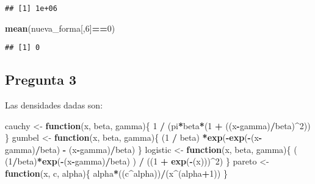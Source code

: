 \documentclass[]{article}
\newenvironment{Shaded}{\begin{snugshade}}{\end{snugshade}}
\newcommand{\ControlFlowTok}[1]{\textcolor[rgb]{0.13,0.29,0.53}{\textbf{#1}}}
\newcommand{\DecValTok}[1]{\textcolor[rgb]{0.00,0.00,0.81}{#1}}
\newcommand{\KeywordTok}[1]{\textcolor[rgb]{0.13,0.29,0.53}{\textbf{#1}}}
\newcommand{\NormalTok}[1]{#1}
\newcommand{\OperatorTok}[1]{\textcolor[rgb]{0.81,0.36,0.00}{\textbf{#1}}}
\newcommand{\StringTok}[1]{\textcolor[rgb]{0.31,0.60,0.02}{#1}}
\begin{document}
\begin{verbatim}
## [1] 1e+06
\end{verbatim}

\begin{Shaded}
\begin{Highlighting}[]
\KeywordTok{mean}\NormalTok{(nueva_forma[,}\DecValTok{6}\NormalTok{]}\OperatorTok{==}\DecValTok{0}\NormalTok{)}
\end{Highlighting}
\end{Shaded}

\begin{verbatim}
## [1] 0
\end{verbatim}

\hypertarget{pregunta-3}{%
\subsection{Pregunta 3}\label{pregunta-3}}

Las densidades dadas son:

\begin{Shaded}
\begin{Highlighting}[]
\NormalTok{cauchy <-}\StringTok{ }\ControlFlowTok{function}\NormalTok{(x, beta, gamma)\{ }
  \DecValTok{1} \OperatorTok{/}\StringTok{ }\NormalTok{(pi}\OperatorTok{*}\NormalTok{beta}\OperatorTok{*}\NormalTok{(}\DecValTok{1} \OperatorTok{+}\StringTok{ }\NormalTok{((x}\OperatorTok{-}\NormalTok{gamma)}\OperatorTok{/}\NormalTok{beta)}\OperatorTok{^}\DecValTok{2}\NormalTok{))}
\NormalTok{\}}
\NormalTok{gumbel <-}\StringTok{ }\ControlFlowTok{function}\NormalTok{(x, beta, gamma)\{ }
\NormalTok{  (}\DecValTok{1} \OperatorTok{/}\StringTok{ }\NormalTok{beta) }\OperatorTok{*}\KeywordTok{exp}\NormalTok{(}\OperatorTok{-}\KeywordTok{exp}\NormalTok{(}\OperatorTok{-}\NormalTok{(x}\OperatorTok{-}\NormalTok{gamma)}\OperatorTok{/}\NormalTok{beta) }\OperatorTok{-}\StringTok{ }\NormalTok{(x}\OperatorTok{-}\NormalTok{gamma)}\OperatorTok{/}\NormalTok{beta)}
\NormalTok{\}}
\NormalTok{logistic <-}\StringTok{ }\ControlFlowTok{function}\NormalTok{(x, beta, gamma)\{}
\NormalTok{  ( (}\DecValTok{1}\OperatorTok{/}\NormalTok{beta)}\OperatorTok{*}\KeywordTok{exp}\NormalTok{(}\OperatorTok{-}\NormalTok{(x}\OperatorTok{-}\NormalTok{gamma)}\OperatorTok{/}\NormalTok{beta) ) }\OperatorTok{/}\StringTok{ }\NormalTok{((}\DecValTok{1} \OperatorTok{+}\StringTok{ }\KeywordTok{exp}\NormalTok{(}\OperatorTok{-}\NormalTok{(x)))}\OperatorTok{^}\DecValTok{2}\NormalTok{)}
\NormalTok{\}}
\NormalTok{pareto <-}\StringTok{ }\ControlFlowTok{function}\NormalTok{(x, c, alpha)\{}
\NormalTok{  alpha}\OperatorTok{*}\NormalTok{((c}\OperatorTok{^}\NormalTok{alpha))}\OperatorTok{/}\NormalTok{(x}\OperatorTok{^}\NormalTok{(alpha}\OperatorTok{+}\DecValTok{1}\NormalTok{))}
\NormalTok{\}}
\end{Highlighting}
\end{Shaded}
\end{document}
